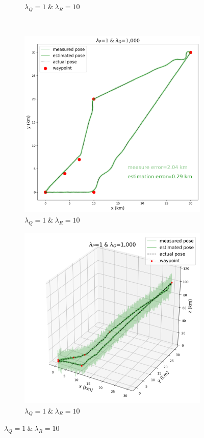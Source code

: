 \begin{figure}[h]
\begin{subfigure}[t]{0.24\textwidth}
 		\caption{$\lambda_Q=1\:\&\:\lambda_R=10$}
 	\end{subfigure} \\
 	\hfill
 	\begin{subfigure}[t]{0.24\textwidth}
 		\centering
 		\includegraphics[width=\linewidth]{figures/estimate_P1_Q1000_2d.png}
 		\caption{$\lambda_Q=1\:\&\:\lambda_R=10$}
 	\end{subfigure} 
 	\hfill
 	\begin{subfigure}[t]{0.24\textwidth}
 		\centering
 		\includegraphics[width=\linewidth]{figures/estimate_P1_Q1000_3d.png}
 		\caption{$\lambda_Q=1\:\&\:\lambda_R=10$}
 	\end{subfigure} 
 	

\end{figure}
